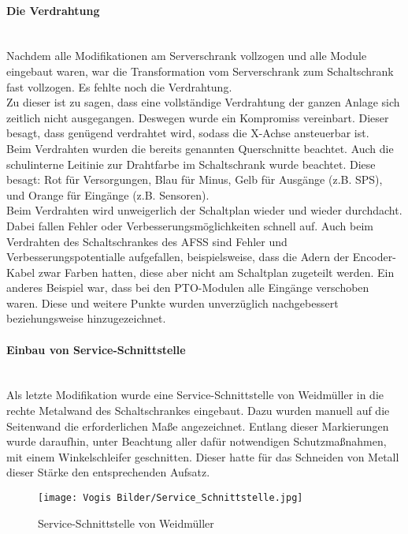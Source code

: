     \paragraph{Die Verdrahtung}\mbox{}\\
    Nachdem alle Modifikationen am Serverschrank vollzogen und alle Module eingebaut waren, war die Transformation vom Serverschrank zum Schaltschrank fast vollzogen. Es fehlte noch die Verdrahtung.\\
    Zu dieser ist zu sagen, dass eine vollständige Verdrahtung der ganzen Anlage sich zeitlich nicht ausgegangen. Deswegen wurde ein Kompromiss vereinbart. Dieser besagt, dass genügend verdrahtet wird, sodass die X-Achse ansteuerbar ist.\\
    Beim Verdrahten wurden die bereits genannten Querschnitte beachtet. Auch die schulinterne Leitinie zur Drahtfarbe im Schaltschrank wurde beachtet. Diese besagt: Rot für Versorgungen, Blau für Minus, Gelb für Ausgänge (z.B. SPS), und Orange für Eingänge (z.B. Sensoren).\\
    Beim Verdrahten wird unweigerlich der Schaltplan wieder und wieder durchdacht. Dabei fallen Fehler oder Verbesserungsmöglichkeiten schnell auf. Auch beim Verdrahten des Schaltschrankes des AFSS sind Fehler und Verbesserungspotentialle aufgefallen, beispielsweise, dass die Adern der Encoder-Kabel zwar Farben hatten, diese aber nicht am Schaltplan zugeteilt werden. Ein anderes Beispiel war, dass bei den PTO-Modulen alle Eingänge verschoben waren. Diese und weitere Punkte wurden unverzüglich nachgebessert beziehungsweise hinzugezeichnet.
    \paragraph{Einbau von Service-Schnittstelle}\mbox{}\\ 
    Als letzte Modifikation wurde eine Service-Schnittstelle von Weidmüller in die rechte Metalwand des Schaltschrankes eingebaut. Dazu wurden manuell auf die Seitenwand die erforderlichen Maße angezeichnet. Entlang dieser Markierungen wurde daraufhin, unter Beachtung aller dafür notwendigen Schutzmaßnahmen, mit einem Winkelschleifer geschnitten. Dieser hatte für das Schneiden von Metall dieser Stärke den entsprechenden Aufsatz. 
    \begin{figure}[H]
        \centering
        \texttt{[image: Vogis Bilder/Service\_Schnittstelle.jpg]}
        \caption{Service-Schnittstelle von Weidmüller}
        \label{fig:Service_Schnittstelle}
    \end{figure}
\newpage
